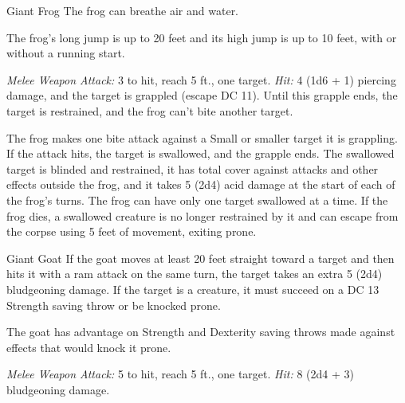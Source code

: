 \documentclass[10pt,a4paper,twoside,bg=print,twocolumn,openany,nodeprecatedcode]{dndbook}
\begin{document}
\begin{DndMonster}[float=t]{Giant Frog}
\DndMonsterBasics[
armor-class = {11},
hit-points = {\DndDice{4d8}},
speed = {30 ft., swim 30 ft.}
]
\DndMonsterAbilityScores[
 str = 12,
 dex = 13,
 con = 11,
 int = 2,
 wis = 10,
 cha = 3
]
\DndMonsterDetails[
skills = {Perception +2, Stealth +3},
senses = {darkvision 30 ft., passive perception 12},
challenge = 1/4,
]
The frog can breathe air and water.

The frog's long jump is up to 20 feet and its high jump is up to 10 feet, with or without a running start.

\textsl{Melee Weapon Attack:} 3 to hit, reach 5 ft., one target. \textsl{Hit:} 4 (1d6 + 1) piercing damage, and the target is grappled (escape DC 11). Until this grapple ends, the target is restrained, and the frog can't bite another target.

The frog makes one bite attack against a Small or smaller target it is grappling. If the attack hits, the target is swallowed, and the grapple ends. The swallowed target is blinded and restrained, it has total cover against attacks and other effects outside the frog, and it takes 5 (2d4) acid damage at the start of each of the frog's turns. The frog can have only one target swallowed at a time. If the frog dies, a swallowed creature is no longer restrained by it and can escape from the corpse using 5 feet of movement, exiting prone.

\end{DndMonster}



\begin{DndMonster}[float=t]{Giant Goat}
\DndMonsterBasics[
armor-class = {11 (natural armor)},
hit-points = {\DndDice{3d10 + 3}},
speed = {40 ft.}
]
\DndMonsterAbilityScores[
 str = 17,
 dex = 11,
 con = 12,
 int = 3,
 wis = 12,
 cha = 6
]
\DndMonsterDetails[
challenge = 1/2,
]
If the goat moves at least 20 feet straight toward a target and then hits it with a ram attack on the same turn, the target takes an extra 5 (2d4) bludgeoning damage. If the target is a creature, it must succeed on a DC 13 Strength saving throw or be knocked prone.

The goat has advantage on Strength and Dexterity saving throws made against effects that would knock it prone.

\textsl{Melee Weapon Attack:} 5 to hit, reach 5 ft., one target. \textsl{Hit:} 8 (2d4 + 3) bludgeoning damage.

\end{DndMonster}
\end{document}
